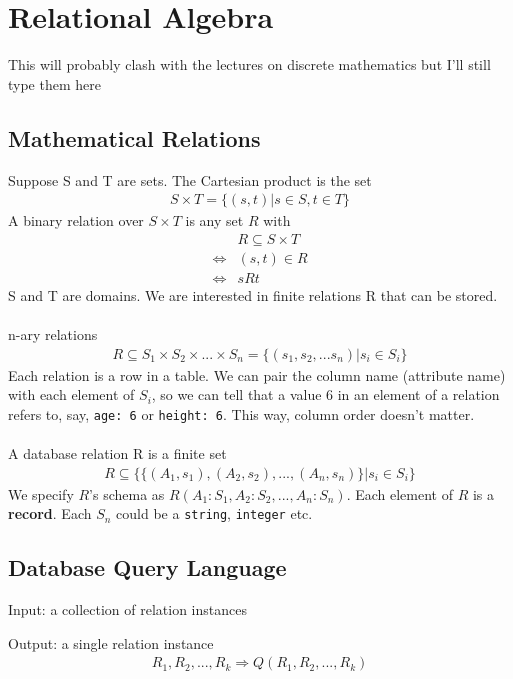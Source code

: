 \documentclass[12pt,a4paper]{article} %
\begin{document}
\section{Relational Algebra}
This will probably clash with the lectures on discrete mathematics but I'll still type them here
\subsection{Mathematical Relations}
Suppose S and T are sets. The Cartesian product is the set
\begin{align*}
S\times T=\{(s,t)|s\in S,t\in T\}
\end{align*}
A binary relation over $S\times T$ is any set $R$ with
\begin{align*}
&R\subseteq S\times T\\
\iff&(s,t)\in R\\
\iff& sRt
\end{align*}
S and T are domains. We are interested in finite relations R that can be stored.
\\\\
n-ary relations
\begin{align*}
R\subseteq S_1\times S_2\times...\times S_n=\{(s_1,s_2,...s_n)|s_i\in S_i\}
\end{align*}
Each relation is a row in a table. We can pair the column name (attribute name) with each element of $S_i$, so we can tell that a value $6$ in an element of a relation refers to, say, \verb|age: 6| or \verb|height: 6|. This way, column order doesn't matter.
\\\\
A database relation R is a finite set
\begin{align*}
R\subseteq \{\{(A_1,s_1),(A_2,s_2),...,(A_n,s_n)\}|s_i\in S_i\}
\end{align*}
We specify $R$'s schema as $R(A_1:S_1, A_2:S_2,...,A_n:S_n)$. Each element of $R$ is a \textbf{record}. Each $S_n$ could be a \verb|string|, \verb|integer| etc.
\subsection{Database Query Language}
Input: a collection of relation instances

Output: a single relation instance
\begin{align*}
R_1,R_2,...,R_k\Rightarrow Q(R_1,R_2,...,R_k)
\end{align*}
\end{document}
